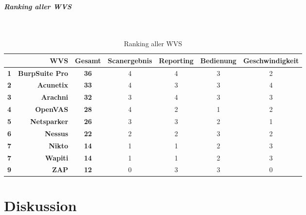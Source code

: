 \documentclass[12pt,oneside,a4paper,parskip]{scrbook}
\begin{document}
     \paragraph{Ranking aller WVS}
     \
     \begin{table}[H]
  \begin{tabular}{|r|r|c|c|c|c|c|}
 \cline{2-7}
 \multicolumn{1}{l|}{} & \textbf{WVS}           & \textbf{Gesamt} & Scanergebnis & Reporting & Bedienung & Geschwindigkeit  \\
 \hline
 \textbf{1}            & \textbf{BurpSuite Pro} & \textbf{36}     & 4            & 4         & 3         & 2                \\
 \hline
 \textbf{2}            & \textbf{Acunetix}      & \textbf{33}\footnotemark     & 4            & 3         & 3         & 4                \\
 \hline
 \textbf{3}            & \textbf{Arachni}       & \textbf{32}     & 3            & 4         & 3         & 3                \\
 \hline
 \textbf{4}            & \textbf{OpenVAS}       & \textbf{28}     & 4            & 2         & 1         & 2                \\
 \hline
 \textbf{5}            & \textbf{Netsparker}    & \textbf{26}     & 3            & 3         & 2         & 1                \\
 \hline
 \textbf{6}            & \textbf{Nessus}        & \textbf{22}     & 2            & 2         & 3         & 2                \\
 \hline
 \textbf{7}            & \textbf{Nikto}         & \textbf{14}     & 1            & 1         & 2         & 3                \\
 \hline
 \textbf{7}            & \textbf{Wapiti}        & \textbf{14}     & 1            & 1         & 2         & 3                \\
 \hline
 \textbf{9}            & \textbf{ZAP}           & \textbf{12}     & 0            & 3         & 3         & 0                \\
 \hline
 \end{tabular}
 \caption[Ranking aller WVS]{Ranking aller WVS}
 \end{table}

\chapter{Diskussion}
\end{document}
